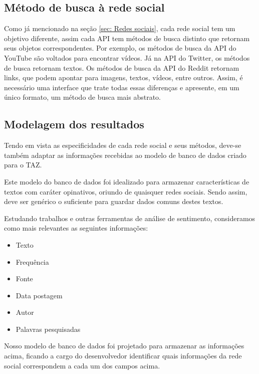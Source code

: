 \subsection{Método de busca à rede social}
\label{subsec: MetodoRedeSocial}
Como já mencionado na seção \ref{sec: Redes sociais}, cada rede social tem um objetivo diferente, assim cada API tem métodos de busca distinto que retornam seus objetos correspondentes. Por exemplo, os métodos de busca da API do YouTube são voltados para encontrar vídeos. Já na API do Twitter, os métodos de busca retornam textos. Os métodos de busca da API do Reddit retornam links, que podem apontar para imagens, textos, vídeos, entre outros.
Assim, é necessário uma interface que trate todas essas diferenças e apresente, em um único formato, um método de busca mais abstrato.

\subsection{Modelagem dos resultados}
\label{subsec: ModelagemDosResultados}
Tendo em vista as especificidades de cada rede social e seus métodos, deve-se também adaptar as informações recebidas ao modelo de banco de dados criado para o TAZ.

Este modelo do banco de dados foi idealizado para armazenar características de textos com caráter opinativos, oriundo de quaisquer redes sociais.
Sendo assim, deve ser genérico o suficiente para guardar dados comuns destes textos.

Estudando trabalhos e outras ferramentas de análise de sentimento, consideramos como mais relevantes as seguintes informações:

\begin{itemize}
    \item Texto
    \item Frequência
    \item Fonte
    \item Data postagem
    \item Autor
    \item Palavras pesquisadas
\end{itemize}

Nosso modelo de banco de dados foi projetado para armazenar as informações acima, ficando a cargo do desenvolvedor identificar quais informações da rede social correspondem a cada um dos campos acima.